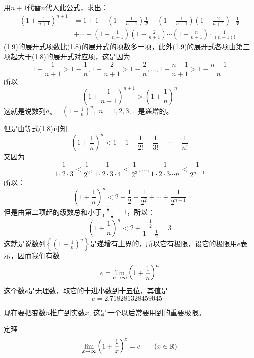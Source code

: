 用$n+1$代替$n$代入此公式，求出：
\begin{equation}
\begin{split}
    \left(1+\frac{1}{n+1}\right)^{n+1}&=1+1+\left(1-\frac{1}{n+1}\right)\frac{1}{2!}+ \left(1-\frac{1}{n+1}\right)\left(1-\frac{2}{n+1}\right)\cdot\frac{1}{3!}\\
    &+\cdots+ \left(1-\frac{1}{n+1}\right) \left(1-\frac{2}{n+1}\right)\cdots\left(1-\frac{n}{n+1}\right)\cdot\frac{1}{(n+1)!}  
\end{split}
\end{equation}
(1.9)的展开式项数比(1.8)的展开式的项数多一项，此外(1.9)的展开式各项由第三项起大于(1.8)的展开式对应项，这是因为
\[1-\frac{1}{n+1}>1-\frac{1}{n},1-\frac{2}{n+1}>1-\frac{2}{n},\ldots, 1-\frac{n-1}{n+1}>1-\frac{n-1}{n}\]
所以
\[\left(1+\frac{1}{n+1}\right)^{n+1}>\left(1+\frac{1}{n}\right)^n\]
这就是说数列$a_n=\left(1+\frac{1}{n}\right)^n,\; n=1,2,3,\ldots$是递增的。

但是由等式(1.8)可知
\[\left(1+\frac{1}{n}\right)^n<1+1+\frac{1}{2!}+\frac{1}{3!}+\cdots+\frac{1}{n!}\]
又因为
\[\frac{1}{1\cdot 2\cdot 3}<\frac{1}{2^2},\frac{1}{1\cdot 2\cdot 3\cdot 4}<\frac{1}{2^3},\ldots,\frac{1}{1\cdot 2\cdot 3\cdots n}<\frac{1}{2^{n-1}}\]
所以：
\[\left(1+\frac{1}{n}\right)^n<2+\frac{1}{2}+\frac{1}{2^2}+\cdots+\frac{1}{2^{n-1}}\]
但是由第二项起的级数总和小于$\frac{\tfrac{1}{2}}{1-\tfrac{1}{2}}=1$，所以：
\[\left(1+\frac{1}{n}\right)^n<2+\frac{\frac{1}{2}}{1-\frac{1}{2}}=3\]
这就是说数列$\left\{\left(1+\frac{1}{n}\right)^n\right\}$是递增有上界的，所以它有极限，设它的极限用$e$表示，因而我们有数
\[e=\displaystyle\lim_{n\to \infty} \left(1+\dfrac{1}{n}\right)^n\]
这个数$e$是无理数，取它的十进小数到十五位，其值是
\[e=2.718281328459045\cdots\]

现在要把变数$n$推广到实数$x$, 这是一个以后常要用到的重要极限。

\begin{blk}{定理}
\[\displaystyle\lim_{x\to \infty} \left(1+\dfrac{1}{x}\right)^x=e\qquad (x\in\mathbb{R})\] 
\end{blk}

